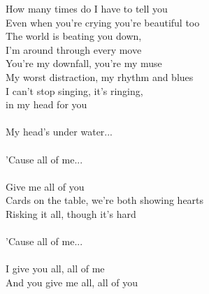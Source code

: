 \begin{multicols}{2}
How many times do I have to tell you\\
Even when you’re crying you’re beautiful too\\
The world is beating you down,\\
I’m around through every move\\
You’re my downfall, you’re my muse\\
My worst distraction, my rhythm and blues\\
I can’t stop singing, it’s ringing,\\
in my head for you\\
\\
My head’s under water...\\
\\
'Cause all of me...\\
\columnbreak
\\
Give me all of you\\
Cards on the table, we’re both showing hearts\\
Risking it all, though it’s hard\\
\\
'Cause all of me...\\
\\
I give you all, all of me\\
And you give me all, all of you\\
\end{multicols}